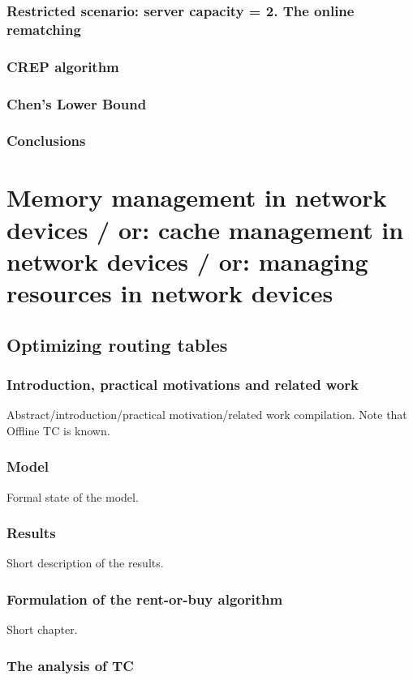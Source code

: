\documentclass[a4paper]{book}
\begin{document}
\section{Restricted scenario: server capacity = 2. The online rematching}
\section{CREP algorithm}
\section{Chen's Lower Bound}
\section{Conclusions}

\part{Memory management in network devices / or: cache management in network devices / or: managing resources in network devices}

\chapter{Optimizing routing tables}

\section{Introduction, practical motivations and related work}

Abstract/introduction/practical motivation/related work compilation.
Note that Offline TC is known.

\section{Model}
Formal state of the model.
\section{Results}
Short description of the results.
\section{Formulation of the rent-or-buy algorithm}
Short chapter.
\section{The analysis of TC}
\end{document}

